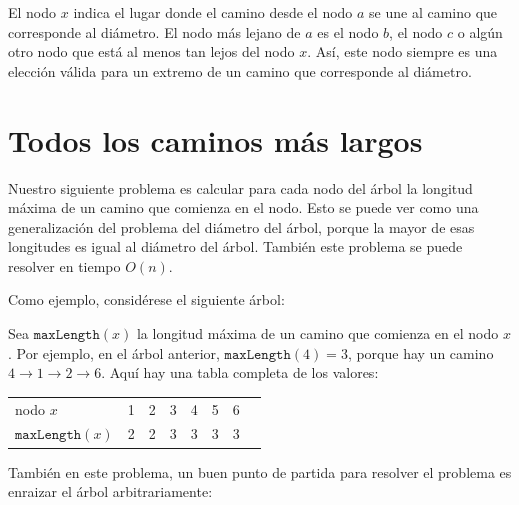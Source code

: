 El nodo $x$ indica el lugar donde el camino
desde el nodo $a$ se une al camino que corresponde
al diámetro.
El nodo más lejano de $a$
es el nodo $b$, el nodo $c$ o algún otro nodo
que está al menos tan lejos del nodo $x$.
Así, este nodo siempre es una elección válida para
un extremo de un camino que corresponde al diámetro.

\section{Todos los caminos más largos}

Nuestro siguiente problema es calcular para cada nodo
del árbol la longitud máxima de un camino
que comienza en el nodo.
Esto se puede ver como una generalización del
problema del diámetro del árbol, porque la mayor de esas
longitudes es igual al diámetro del árbol.
También este problema se puede resolver en tiempo $O(n)$.

Como ejemplo, considérese el siguiente árbol:
\begin{center}
\end{center}

Sea $\texttt{maxLength}(x)$ la longitud máxima
de un camino que comienza en el nodo $x$.
Por ejemplo, en el árbol anterior,
$\texttt{maxLength}(4)=3$, porque hay
un camino $4 \rightarrow 1 \rightarrow 2 \rightarrow 6$.
Aquí hay una tabla completa de los valores:
\begin{center}
\begin{tabular}{l|lllllll}
nodo $x$ & 1 & 2 & 3 & 4 & 5 & 6 \\
$\texttt{maxLength}(x)$ & 2 & 2 & 3 & 3 & 3 & 3 \\
\end{tabular}
\end{center}

También en este problema, un buen punto de partida
para resolver el problema es enraizar el árbol arbitrariamente:
\begin{center}
\end{center}

